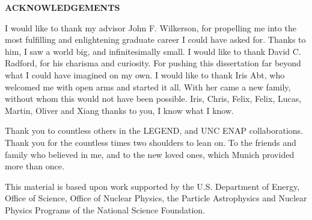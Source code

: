 
\begin{center}
\vspace*{52pt}
{\normalfont \textbf{ACKNOWLEDGEMENTS}}
\end{center}

I would like to thank my advisor John F. Wilkerson, for propelling me into the most fulfilling and enlightening graduate career I could have asked for. Thanks to him, I saw a world big, and infinitesimally small. I would like to thank David C. Radford, for his charisma and curiosity. For pushing this dissertation far beyond what I could have imagined on my own. I would like to thank Iris Abt, who welcomed me with open arms and started it all. With her came a new family, without whom this would not have been possible. Iris, Chris, Felix, Felix, Lucas, Martin, Oliver and Xiang thanks to you, I know what I know.

Thank you to countless others in the LEGEND, {\MJMit} and UNC ENAP collaborations. Thank you for the countless times two shoulders to lean on. To the friends and family who believed in me, and to the new loved ones, which Munich provided more than once. 

This material is based upon work supported by the U.S. Department of Energy, Office of Science, Office of Nuclear Physics, the Particle Astrophysics and Nuclear Physics Programs of the National Science Foundation.

\clearpage
